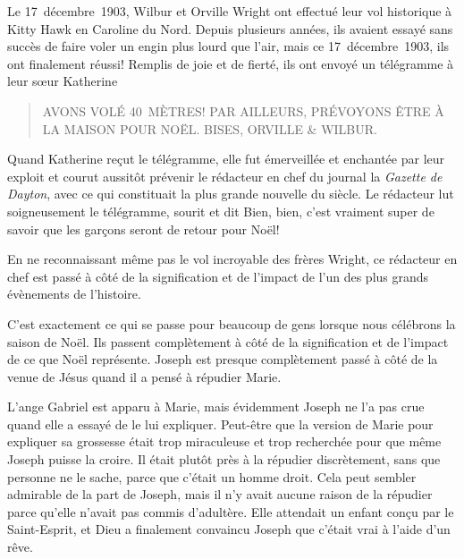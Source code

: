 

Le 17~décembre~1903, Wilbur et Orville Wright ont effectué leur vol historique à Kitty Hawk en Caroline du Nord. Depuis plusieurs années, ils avaient essayé sans succès de faire voler un engin plus lourd que l'air, mais ce 17~décembre~1903, ils ont finalement réussi! Remplis de joie et de fierté, ils ont envoyé un télégramme à leur sœur Katherine\frcolon{}


\begin{quote}
\small\telegramfont\MakeUppercase{Avons volé 40~mètres! Par ailleurs, prévoyons être à la maison pour Noël. Bises, Orville \& Wilbur.}
\end{quote}

Quand Katherine reçut le télégramme, elle fut émerveillée et enchantée par leur exploit et courut aussitôt prévenir le rédacteur en chef du journal la \emph{Gazette de Dayton}, avec ce qui constituait la plus grande nouvelle du siècle. Le rédacteur lut soigneusement le télégramme, sourit et dit\frcolon{} \Og Bien, bien, c'est vraiment super de savoir que les garçons seront de retour pour Noël! \Fg{}

En ne reconnaissant même pas le vol incroyable des frères Wright, ce rédacteur en chef est passé à côté de la signification et de l'impact de l'un des plus grands évènements de l'histoire.

C'est exactement ce qui se passe pour beaucoup de gens lorsque nous célébrons la saison de Noël. Ils passent complètement à côté de la signification et de l'impact de ce que Noël représente. Joseph est presque complètement passé à côté de la venue de Jésus quand il a pensé à répudier Marie.

L'ange Gabriel est apparu à Marie, mais évidemment Joseph ne l'a pas crue quand elle a essayé de le lui expliquer. Peut-être que la version de Marie pour expliquer sa grossesse était trop miraculeuse et trop recherchée pour que même Joseph puisse la croire. Il était plutôt près à la répudier discrètement, sans que personne ne le sache, parce que c'était un homme droit. Cela peut sembler admirable de la part de Joseph, mais il n'y avait aucune raison de la répudier parce qu'elle n'avait pas commis d'adultère. Elle attendait un enfant conçu par le Saint-Esprit, et Dieu a finalement convaincu Joseph que c'était vrai à l'aide d'un rêve.

